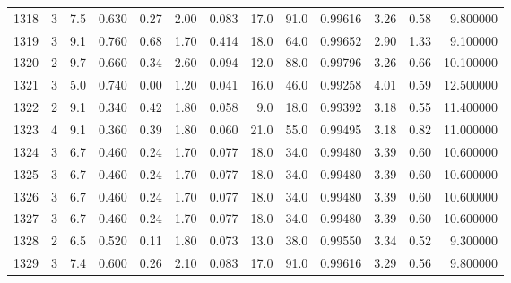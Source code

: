 \begin{tabular}{lrrrrrrrrrrrr}
1318 &        3 &            7.5 &             0.630 &         0.27 &            2.00 &      0.083 &                 17.0 &                  91.0 &  0.99616 &  3.26 &       0.58 &   9.800000 \\
1319 &        3 &            9.1 &             0.760 &         0.68 &            1.70 &      0.414 &                 18.0 &                  64.0 &  0.99652 &  2.90 &       1.33 &   9.100000 \\
1320 &        2 &            9.7 &             0.660 &         0.34 &            2.60 &      0.094 &                 12.0 &                  88.0 &  0.99796 &  3.26 &       0.66 &  10.100000 \\
1321 &        3 &            5.0 &             0.740 &         0.00 &            1.20 &      0.041 &                 16.0 &                  46.0 &  0.99258 &  4.01 &       0.59 &  12.500000 \\
1322 &        2 &            9.1 &             0.340 &         0.42 &            1.80 &      0.058 &                  9.0 &                  18.0 &  0.99392 &  3.18 &       0.55 &  11.400000 \\
1323 &        4 &            9.1 &             0.360 &         0.39 &            1.80 &      0.060 &                 21.0 &                  55.0 &  0.99495 &  3.18 &       0.82 &  11.000000 \\
1324 &        3 &            6.7 &             0.460 &         0.24 &            1.70 &      0.077 &                 18.0 &                  34.0 &  0.99480 &  3.39 &       0.60 &  10.600000 \\
1325 &        3 &            6.7 &             0.460 &         0.24 &            1.70 &      0.077 &                 18.0 &                  34.0 &  0.99480 &  3.39 &       0.60 &  10.600000 \\
1326 &        3 &            6.7 &             0.460 &         0.24 &            1.70 &      0.077 &                 18.0 &                  34.0 &  0.99480 &  3.39 &       0.60 &  10.600000 \\
1327 &        3 &            6.7 &             0.460 &         0.24 &            1.70 &      0.077 &                 18.0 &                  34.0 &  0.99480 &  3.39 &       0.60 &  10.600000 \\
1328 &        2 &            6.5 &             0.520 &         0.11 &            1.80 &      0.073 &                 13.0 &                  38.0 &  0.99550 &  3.34 &       0.52 &   9.300000 \\
1329 &        3 &            7.4 &             0.600 &         0.26 &            2.10 &      0.083 &                 17.0 &                  91.0 &  0.99616 &  3.29 &       0.56 &   9.800000 \\

\end{tabular}
